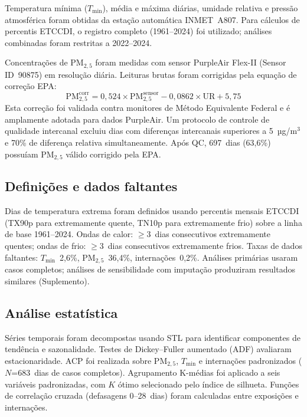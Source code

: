 \documentclass[12pt]{article}
\begin{document}
Temperatura mínima ($T_\mathrm{min}$), média e máxima diárias,
umidade relativa e pressão atmosférica foram obtidas da estação
automática INMET~A807. Para cálculos de percentis ETCCDI, o registro
completo (1961--2024) foi utilizado; análises combinadas foram
restritas a 2022--2024.

Concentrações de PM$_{2,5}$ foram medidas com sensor PurpleAir
Flex-II (Sensor ID~90875) em resolução diária. Leituras brutas foram
corrigidas pela equação de correção EPA:
%
\begin{equation}
  \mathrm{PM}_{2{,}5}^{\mathrm{corr}} =
    0{,}524 \times \mathrm{PM}_{2{,}5}^{\mathrm{sensor}}
    - 0{,}0862 \times \mathrm{UR} + 5{,}75
\end{equation}
%
Esta correção foi validada contra monitores de Método Equivalente
Federal e é amplamente adotada para dados PurpleAir. Um protocolo de
controle de qualidade intercanal excluiu dias com diferenças
intercanais superiores a 5~µg/m$^3$ e 70\% de diferença relativa
simultaneamente. Após QC, 697~dias (63,6\%) possuíam PM$_{2,5}$
válido corrigido pela EPA.

\subsection{Definições e dados faltantes}

Dias de temperatura extrema foram definidos usando percentis mensais
ETCCDI (TX90p para extremamente quente, TN10p para extremamente frio)
sobre a linha de base 1961--2024. Ondas de calor:
$\geq$3~dias consecutivos extremamente quentes; ondas de frio:
$\geq$3~dias consecutivos extremamente frios. Taxas de dados
faltantes: $T_\mathrm{min}$~2,6\%, PM$_{2,5}$~36,4\%,
internações~0,2\%. Análises primárias usaram casos completos; análises
de sensibilidade com imputação produziram resultados similares
(Suplemento).

\subsection{Análise estatística}

Séries temporais foram decompostas usando STL para identificar
componentes de tendência e sazonalidade. Testes de Dickey--Fuller
aumentado (ADF) avaliaram estacionaridade. ACP foi realizada sobre
PM$_{2,5}$, $T_\mathrm{min}$ e internações padronizados ($N$=683~dias
de casos completos). Agrupamento K-médias foi aplicado a seis
variáveis padronizadas, com $K$ ótimo selecionado pelo índice de
silhueta. Funções de correlação cruzada (defasagens 0--28~dias) foram
calculadas entre exposições e internações.
\end{document}
